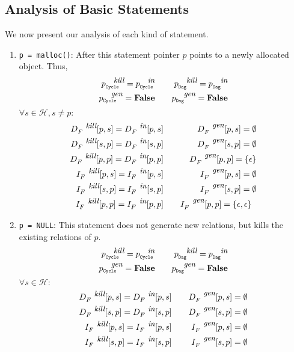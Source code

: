 \documentclass[runningheads,a4paper]{llncs}
\newcommand{\p}{\ensuremath{p}}
\newcommand{\s}{\ensuremath{s}}
\newcommand{\heap}{\ensuremath{\mathcal{H}}}
\newcommand{\subC}{\mbox{\scalebox{.6}{\Cycle}}}
\newcommand{\subD}{\mbox{\scalebox{.6}{\Dag}}}
\newcommand{\epsilonset}{\ensuremath{\{\epsilon\}}}
\newcommand{\epsilonpairset}{\ensuremath{\{\epsilon,\epsilon\}}}
\newcommand{\din}{\mbox{\footnotesize\em in}}
\newcommand{\dkill}{\mbox{\footnotesize\em kill}}
\newcommand{\dgen}{\mbox{\footnotesize\em gen}}
\newcommand{\GenC}[1]{\ensuremath{{#1}_{\subC}^{\dgen}}}
\newcommand{\GenD}[1]{\ensuremath{{#1}_{\subD}^{\dgen}}}
\newcommand{\KillC}[1]{\ensuremath{{#1}_{\subC}^{\dkill}}}
\newcommand{\KillD}[1]{\ensuremath{{#1}_{\subD}^{\dkill}}}
\newcommand{\InC}[1]{\ensuremath{{#1}_{\subC}^{\din}}}
\newcommand{\InD}[1]{\ensuremath{{#1}_{\subD}^{\din}}}
\newcommand{\Dag}{{\tt Dag}}
\newcommand{\Cycle}{{\tt Cycle}}
\newcommand{\false}{\textbf{False}}
\begin{document}
\subsection{Analysis of Basic Statements} \label{Analysis_of_Basic_Statements}
We now present our analysis of each kind of statement.
\begin{enumerate}
\item {{\tt p = malloc()}}:
  After this statement pointer $\p$ points to a newly allocated
  object. Thus,
\begin{eqnarray*}
  \KillC{p}  = \InC{p} &\quad& \KillD{p} = \InD{p} \\
  \GenC{p} = \false 	 &\quad& \GenD{p} = \false 
\end{eqnarray*}
$\forall \s \in \heap, \s \not= \p:$
\begin{eqnarray*}
  D_F^{\dkill}[\p,\s]  =  D_F^{\din}[\p,\s] &\quad&
  D_F^{\dgen}[\p,\s]    =  \emptyset \\ 
  D_F^{\dkill}[\s,\p]  =  D_F^{\din}[\s,\p] &\quad&
  D_F^{\dgen}[\s,\p]    =  \emptyset \\
  D_F^{\dkill}[\p,\p]  =  D_F^{\din}[\p,\p] &\quad&
  D_F^{\dgen}[\p,\p]    =  \epsilonset\\
  I_F^{\dkill}[\p,\s]  =  I_F^{\din}[\p,\s] &\quad&
  I_F^{\dgen}[\p,\s]    =  \emptyset \\
  I_F^{\dkill}[\s,\p]  =  I_F^{\din}[\s,\p] &\quad&
  I_F^{\dgen}[\s,\p]    =  \emptyset \\
  I_F^{\dkill}[\p,\p]  =  I_F^{\din}[\p,\p] &\quad&
  I_F^{\dgen}[\p,\p]    =  \epsilonpairset \rule{2mm}{0pt}\\
\end{eqnarray*}

\item{\tt p = NULL}:
This statement does not generate new relations, but
kills the existing relations of \p.
\begin{eqnarray*}
  \KillC{p}  = \InC{p} &\quad& \KillD{p} = \InD{p} \\
  \GenC{p} = \false 	 &\quad& \GenD{p} = \false 
\end{eqnarray*}
$\forall \s \in \heap:$
\begin{eqnarray*}
  D_F^{\dkill}[\p,\s]  =  D_F^{\din}[\p,\s] &\quad&
  D_F^{\dgen}[\p,\s]    =  \emptyset \\ 
  D_F^{\dkill}[\s,\p]  =  D_F^{\din}[\s,\p] &\quad&
  D_F^{\dgen}[\s,\p]    =  \emptyset \\
  I_F^{\dkill}[\p,\s]  =  I_F^{\din}[\p,\s] &\quad&
  I_F^{\dgen}[\p,\s]    =  \emptyset \\
  I_F^{\dkill}[\s,\p]  =  I_F^{\din}[\s,\p] &\quad&
  I_F^{\dgen}[\s,\p]    =  \emptyset \\
\end{eqnarray*}


\end{enumerate}
\end{document}
